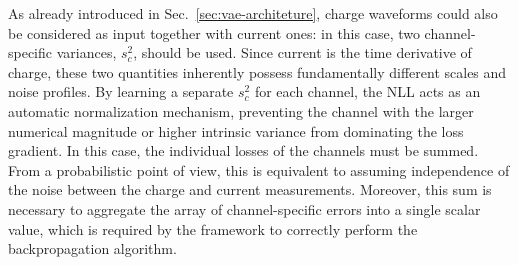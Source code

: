 As already introduced in Sec.~\ref{sec:vae-architeture}, charge waveforms could also be considered as input together with current ones: in this case, two channel-specific variances, $s_c^2$, should be used. Since current is the time derivative of charge, these two quantities inherently possess fundamentally different scales and noise profiles. By learning a separate $s_c^2$ for each channel, the \ac{NLL} acts as an automatic normalization mechanism, preventing the channel with the larger numerical magnitude or higher intrinsic variance from dominating the loss gradient. In this case, the individual losses of the channels must be summed. From a probabilistic point of view, this is equivalent to assuming independence of the noise between the charge and current measurements. Moreover, this sum is necessary to aggregate the array of channel-specific errors into a single scalar value, which is required by the framework to correctly perform the backpropagation algorithm.

